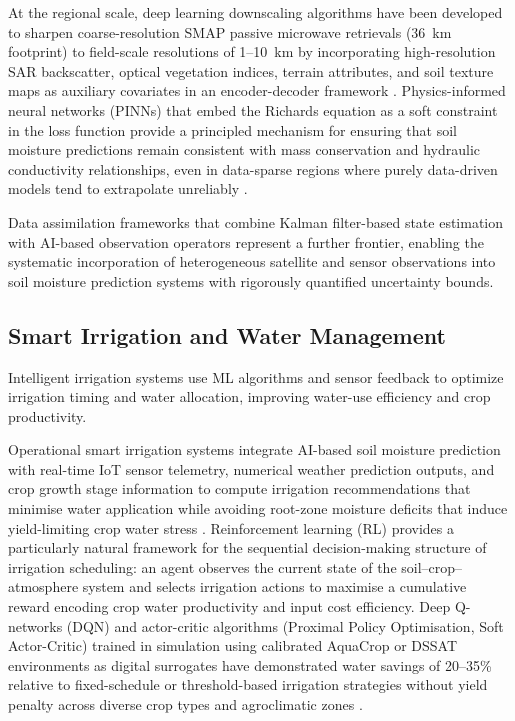 \documentclass[land,article,submit,pdftex,moreauthors]{Definitions/mdpi}
\numberwithin{equation}{section}
\begin{document}
At the regional scale, deep learning downscaling algorithms have been developed to sharpen coarse-resolution SMAP passive microwave retrievals (36~km footprint) to field-scale resolutions of 1--10~km by incorporating high-resolution SAR backscatter, optical vegetation indices, terrain attributes, and soil texture maps as auxiliary covariates in an encoder-decoder framework \citep{fang2019deep}. Physics-informed neural networks (PINNs) that embed the Richards equation as a soft constraint in the loss function provide a principled mechanism for ensuring that soil moisture predictions remain consistent with mass conservation and hydraulic conductivity relationships, even in data-sparse regions where purely data-driven models tend to extrapolate unreliably \citep{karniadakis2021physics}.

Data assimilation frameworks that combine Kalman filter-based state estimation with AI-based observation operators represent a further frontier, enabling the systematic incorporation of heterogeneous satellite and sensor observations into soil moisture prediction systems with rigorously quantified uncertainty bounds.

\subsection{Smart Irrigation and Water Management}

Intelligent irrigation systems use ML algorithms and sensor feedback to optimize irrigation timing and water allocation, improving water-use efficiency and crop productivity.

Operational smart irrigation systems integrate AI-based soil moisture prediction with real-time IoT sensor telemetry, numerical weather prediction outputs, and crop growth stage information to compute irrigation recommendations that minimise water application while avoiding root-zone moisture deficits that induce yield-limiting crop water stress \citep{vij2020iot}. Reinforcement learning (RL) provides a particularly natural framework for the sequential decision-making structure of irrigation scheduling: an agent observes the current state of the soil--crop--atmosphere system and selects irrigation actions to maximise a cumulative reward encoding crop water productivity and input cost efficiency. Deep Q-networks (DQN) and actor-critic algorithms (Proximal Policy Optimisation, Soft Actor-Critic) trained in simulation using calibrated AquaCrop or DSSAT environments as digital surrogates have demonstrated water savings of 20--35\% relative to fixed-schedule or threshold-based irrigation strategies without yield penalty across diverse crop types and agroclimatic zones \citep{yang2020rl}.
\end{document}

